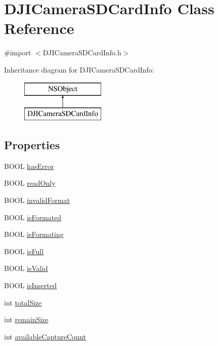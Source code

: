 \hypertarget{interface_d_j_i_camera_s_d_card_info}{\section{D\+J\+I\+Camera\+S\+D\+Card\+Info Class Reference}
\label{interface_d_j_i_camera_s_d_card_info}
}


{\ttfamily \#import $<$D\+J\+I\+Camera\+S\+D\+Card\+Info.\+h$>$}

Inheritance diagram for D\+J\+I\+Camera\+S\+D\+Card\+Info\+:\begin{figure}[H]
\begin{center}
\leavevmode
\includegraphics[height=2.000000cm]{interface_d_j_i_camera_s_d_card_info}
\end{center}
\end{figure}
\subsection*{Properties}
\begin{DoxyCompactItemize}
\item 
B\+O\+O\+L \hyperlink{interface_d_j_i_camera_s_d_card_info_a0fb344a71d20c3f43bb4b68c51300cbb}{has\+Error}
\item 
B\+O\+O\+L \hyperlink{interface_d_j_i_camera_s_d_card_info_a3e3d67655f38d71c0aab6ae7a132e396}{read\+Only}
\item 
B\+O\+O\+L \hyperlink{interface_d_j_i_camera_s_d_card_info_af79c37797d1d0eb7e2b132b217a94290}{invalid\+Format}
\item 
B\+O\+O\+L \hyperlink{interface_d_j_i_camera_s_d_card_info_ab8cf4478b6ae1e49c1fe4cb4969b26e5}{is\+Formated}
\item 
B\+O\+O\+L \hyperlink{interface_d_j_i_camera_s_d_card_info_a61802b45c064b527ff835725e16e4c30}{is\+Formating}
\item 
B\+O\+O\+L \hyperlink{interface_d_j_i_camera_s_d_card_info_a4e68054993b2d9bd2d0fc544c6e1f380}{is\+Full}
\item 
B\+O\+O\+L \hyperlink{interface_d_j_i_camera_s_d_card_info_af59a91c8c2d10546da7168d7d10310ed}{is\+Valid}
\item 
B\+O\+O\+L \hyperlink{interface_d_j_i_camera_s_d_card_info_ad625b9a7a4047c03c0419a90b1fa335b}{is\+Inserted}
\item 
int \hyperlink{interface_d_j_i_camera_s_d_card_info_a880e1b513893d27cc94c83e405a72667}{total\+Size}
\item 
int \hyperlink{interface_d_j_i_camera_s_d_card_info_aa44ca2930b598e41704aaa9ba67c95dc}{remain\+Size}
\item 
int \hyperlink{interface_d_j_i_camera_s_d_card_info_a27f92f3e797ec9a590ac62545d8c3d03}{available\+Capture\+Count}
\end{DoxyCompactItemize}


